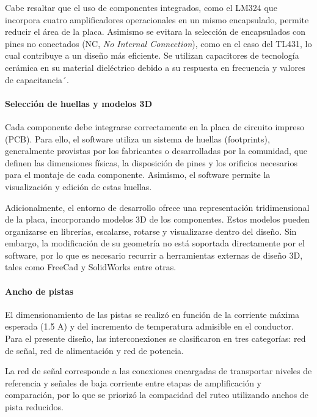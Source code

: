 \documentclass[]{article}
\begin{document}
	Cabe resaltar que el uso de componentes integrados, como el LM324 que incorpora cuatro amplificadores operacionales en un mismo encapsulado, permite reducir el área de la placa. Asimismo se evitara la selección de encapsulados con pines no conectados (NC, \textit{No Internal Connection}), como en el caso del TL431, lo cual contribuye a un diseño más eficiente. Se utilizan capacitores de tecnología cerámica en su material dieléctrico debido a su respuesta en frecuencia y valores de capacitancia´.
	
		
	\paragraph{Selección de huellas y modelos 3D}
	
	Cada componente debe integrarse correctamente en la placa de circuito impreso (PCB). Para ello, el software utiliza un sistema de huellas (footprints), generalmente provistas por los fabricantes o desarrolladas por la comunidad, que definen las dimensiones físicas, la disposición de pines y los orificios necesarios para el montaje de cada componente. Asimismo, el software permite la visualización y edición de estas huellas.
	
	Adicionalmente, el entorno de desarrollo ofrece una representación tridimensional de la placa, incorporando modelos 3D de los componentes. Estos modelos pueden organizarse en librerías, escalarse, rotarse y visualizarse dentro del diseño. Sin embargo, la modificación de su geometría no está soportada directamente por el software, por lo que es necesario recurrir a herramientas externas de diseño 3D, tales como FreeCad y SolidWorks entre otras.
	
	\paragraph{Ancho de pistas}
	
	
	El dimensionamiento de las pistas se realizó en función de la corriente máxima esperada (1.5 A) y del incremento de temperatura admisible en el conductor. Para el presente diseño, las interconexiones se clasificaron en tres categorías: red de señal, red de alimentación y red de potencia.
	
	La red de señal corresponde a las conexiones encargadas de transportar niveles de referencia y señales de baja corriente entre etapas de amplificación y comparación, por lo que se priorizó la compacidad del ruteo utilizando anchos de pista reducidos.
	
\end{document}

